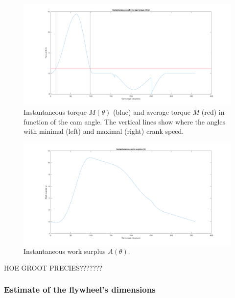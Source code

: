 \documentclass[a4paper]{article}
\begin{document}
\begin{figure}
	\centering
	\includegraphics[width=.9\textwidth]{torque.png}
	\caption{Instantaneous torque \(M(\theta)\) (blue) and average torque \(\overline{M}\) (red) in function of the cam angle. The vertical lines show where the angles with minimal (left) and maximal (right) crank speed.}
	\label{fig:torque}
\end{figure}
\begin{figure}
	\centering
	\includegraphics[width=.9\textwidth]{work.png}
	\caption{Instantaneous work surplus \(A(\theta)\).}
	\label{fig:work}
\end{figure}

HOE GROOT PRECIES???????

\subsubsection{Estimate of the flywheel's dimensions}
\end{document}
